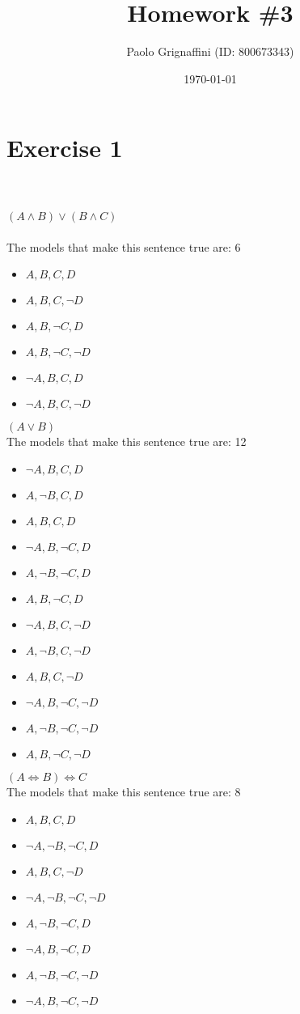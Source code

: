 \documentclass{article}
\title{Homework \#3}
\date{\today}
\author{Paolo Grignaffini (ID: 800673343)}
\begin{document}
	\maketitle
	
\section*{Exercise 1}
\paragraph{}~\\~\\
$(A \land B) \lor (B \land C)$\\
\\
The models that make this sentence true are: 6
\begin{itemize}
	\item $A,B,C,D$
	\item $A,B,C,\lnot D$
	\item $A,B,\lnot C,D$
	\item $A,B,\lnot C,\lnot D$
	\item$\lnot A,B,C,D$
	\item $\lnot A, B,C, \lnot D$
\end{itemize}


$(A \lor B)$\\
The models that make this sentence true are: 12
\begin{itemize}
\item $\lnot A, B, C, D$
\item $A, \lnot B, C, D$
\item $A, B, C, D$
\item $\lnot A, B, \lnot C, D$
\item $A, \lnot B, \lnot C, D$
\item $A, B, \lnot C, D$
\item $\lnot A, B, C, \lnot D$
\item $A, \lnot B, C, \lnot D$
\item $A, B, C, \lnot D$
\item $\lnot A, B, \lnot C, \lnot D$
\item $A, \lnot B, \lnot C, \lnot D$
\item $A, B, \lnot C, \lnot D$
\end{itemize}

$(A \iff B) \iff C$\\
The models that make this sentence true are: 8
\begin{itemize}
\item $A,B,C,D$
\item $\lnot A, \lnot B, \lnot C,D$
\item $A,B,C,\lnot D$
\item $\lnot A, \lnot B, \lnot C, \lnot D$
\item $A,\lnot B, \lnot C,D$
\item $\lnot A, B, \lnot C,D$
\item $A,\lnot B, \lnot C,\lnot D$
\item $\lnot A, B, \lnot C,\lnot D$
\end{itemize}
\end{document}
